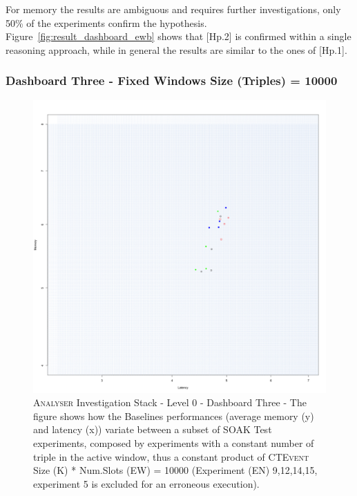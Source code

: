 For memory the results are ambiguous and requires further investigations, only 50\% of the experiments confirm the hypothesis. Figure~\ref{fig:result_dashboard_ewb} shows that [Hp.2] is confirmed within a single reasoning approach, while in general the results are similar to the ones of [Hp.1].

\subsubsection{Dashboard Three - Fixed Windows Size (Triples) = 10000 } 

\begin{figure}[h!tbp]
	\centering
	\includegraphics[width=0.85\linewidth]{images/dashboard-3}	
	\caption[\textsc{Analyser} Investigation Stack - Level 0 - Dashboard Three - Multiplot Version]	{\textsc{Analyser} Investigation Stack - Level 0 - Dashboard Three - The figure shows how the Baselines performances (average memory (y) and latency (x))  variate between a subset of SOAK Test experiments, composed by experiments with a constant number of triple in the active window, thus a constant product of \textsc{CTEvent} Size (K) * Num.Slots (EW) = 10000 (Experiment (EN) 9,12,14,15, experiment 5 is excluded for an erroneous execution).}
	\label{fig:result_dashboard_probb}
\end{figure}

